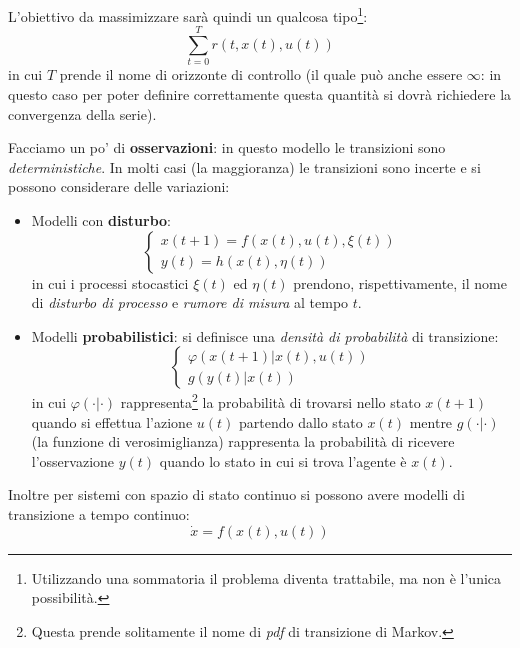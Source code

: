 L'obiettivo da massimizzare sar\`a quindi un qualcosa tipo\footnote{Utilizzando una sommatoria il problema diventa trattabile, ma non \`e l'unica possibilit\`a.}:
\begin{equation}
\sum_{t=0}^T r(t, x(t), u(t))
\end{equation}
in cui $T$ prende il nome di orizzonte di controllo (il quale pu\`o anche essere $\infty$: in questo caso per poter definire correttamente questa quantit\`a si dovr\`a richiedere la convergenza della serie).
\begin{center}
\end{center}
Facciamo un po' di \textbf{osservazioni}: in questo modello le transizioni sono \textit{deterministiche}. In molti casi (la maggioranza) le transizioni sono incerte e si possono considerare delle variazioni:
\begin{itemize}
\item Modelli con \textbf{disturbo}: 
    \begin{equation}
    \begin{cases}
    x(t+1) = f(x(t), u(t), \xi(t)) \\
    y(t) = h(x(t), \eta(t))
    \end{cases}
    \end{equation} 
    in cui i processi stocastici $\xi(t)$ ed $\eta(t)$ prendono, rispettivamente, il nome di \textit{disturbo di processo} e \textit{rumore di misura} al tempo $t$.
\item Modelli \textbf{probabilistici}: si definisce una \textit{densit\`a di probabilit\`a} di transizione: 
   \begin{equation}
   \begin{cases}
   \varphi ( x(t+1)| x(t), u(t)  ) \\
   g (y(t) | x(t) )
   \end{cases}
   \end{equation} 
   in cui $\varphi(\cdot | \cdot)$ rappresenta\footnote{Questa prende solitamente il nome di \textit{pdf} di transizione di Markov.} la probabilit\`a di trovarsi nello stato $x(t+1)$ quando si effettua l'azione $u(t)$ partendo dallo stato $x(t)$ mentre $g(\cdot|\cdot)$ (la funzione di verosimiglianza) rappresenta la probabilit\`a
   di ricevere l'osservazione $y(t)$ quando lo stato in cui si trova l'agente \`e $x(t)$.
\end{itemize}
Inoltre per sistemi con spazio di stato continuo si possono avere modelli di transizione a tempo continuo:
\begin{equation}
\dot{x} = f(x(t), u(t))
\end{equation}

